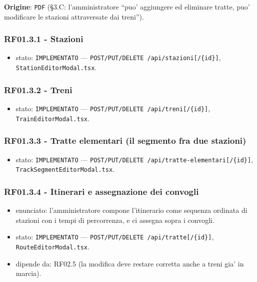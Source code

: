 \documentclass[11pt]{article}
\begin{document}
\textbf{Origine}: \texttt{PDF} (§3.C: l'amministratore ``puo' aggiungere ed eliminare tratte, puo' modificare le
stazioni attraversate dai treni'').
\subsubsection{RF01.3.1 - Stazioni}
\label{sec:org9ad6bee}
\begin{itemize}
\item stato: \texttt{IMPLEMENTATO} — \texttt{POST/PUT/DELETE /api/stazioni[/\{id\}]}, \texttt{StationEditorModal.tsx}.
\end{itemize}
\subsubsection{RF01.3.2 - Treni}
\label{sec:orgb89047c}
\begin{itemize}
\item stato: \texttt{IMPLEMENTATO} — \texttt{POST/PUT/DELETE /api/treni[/\{id\}]}, \texttt{TrainEditorModal.tsx}.
\end{itemize}
\subsubsection{RF01.3.3 - Tratte elementari (il segmento fra due stazioni)}
\label{sec:orgd66ea8b}
\begin{itemize}
\item stato: \texttt{IMPLEMENTATO} — \texttt{POST/PUT/DELETE /api/tratte-elementari[/\{id\}]},
\texttt{TrackSegmentEditorModal.tsx}.
\end{itemize}
\subsubsection{RF01.3.4 - Itinerari e assegnazione dei convogli}
\label{sec:org3aa7cf6}
\begin{itemize}
\item enunciato: l'amministratore compone l'itinerario come sequenza ordinata di stazioni con i tempi
di percorrenza, e ci assegna sopra i convogli.
\item stato: \texttt{IMPLEMENTATO} — \texttt{POST/PUT/DELETE /api/tratte[/\{id\}]}, \texttt{RouteEditorModal.tsx}.
\item dipende da: RF02.5 (la modifica deve restare corretta anche a treni gia' in marcia).
\end{itemize}
\end{document}
